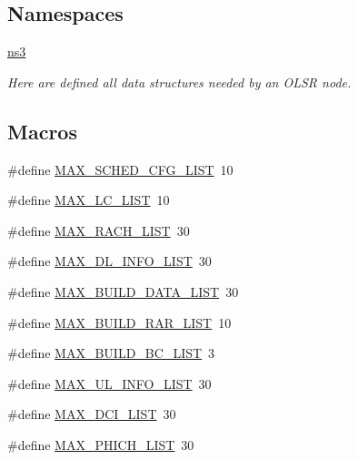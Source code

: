\subsection*{Namespaces}
\begin{DoxyCompactItemize}
\item 
 \hyperlink{namespacens3}{ns3}
\begin{DoxyCompactList}\small\item\em Here are defined all data structures needed by an O\+L\+SR node. \end{DoxyCompactList}\end{DoxyCompactItemize}
\subsection*{Macros}
\begin{DoxyCompactItemize}
\item 
\#define \hyperlink{ff-mac-common_8h_aad4dc08fdd5cdb203f02603b0a6b3d89}{M\+A\+X\+\_\+\+S\+C\+H\+E\+D\+\_\+\+C\+F\+G\+\_\+\+L\+I\+ST}~10
\item 
\#define \hyperlink{ff-mac-common_8h_a7c5f9089622a954046da0233f8170d7b}{M\+A\+X\+\_\+\+L\+C\+\_\+\+L\+I\+ST}~10
\item 
\#define \hyperlink{ff-mac-common_8h_a5398bf2c98470d11ed72c02bbbb394d4}{M\+A\+X\+\_\+\+R\+A\+C\+H\+\_\+\+L\+I\+ST}~30
\item 
\#define \hyperlink{ff-mac-common_8h_ac3cb58b4e7ec513eef5541fcd63e5bcf}{M\+A\+X\+\_\+\+D\+L\+\_\+\+I\+N\+F\+O\+\_\+\+L\+I\+ST}~30
\item 
\#define \hyperlink{ff-mac-common_8h_a9487fcd0bc7829ab33e710bff66188d2}{M\+A\+X\+\_\+\+B\+U\+I\+L\+D\+\_\+\+D\+A\+T\+A\+\_\+\+L\+I\+ST}~30
\item 
\#define \hyperlink{ff-mac-common_8h_a639682eee3d4c39e0fcdc7f75c67946f}{M\+A\+X\+\_\+\+B\+U\+I\+L\+D\+\_\+\+R\+A\+R\+\_\+\+L\+I\+ST}~10
\item 
\#define \hyperlink{ff-mac-common_8h_a8a7338a6269bfde52aee76311c46ecbc}{M\+A\+X\+\_\+\+B\+U\+I\+L\+D\+\_\+\+B\+C\+\_\+\+L\+I\+ST}~3
\item 
\#define \hyperlink{ff-mac-common_8h_aa3b535d19d648899d1099a87baa468c4}{M\+A\+X\+\_\+\+U\+L\+\_\+\+I\+N\+F\+O\+\_\+\+L\+I\+ST}~30
\item 
\#define \hyperlink{ff-mac-common_8h_aa8f13728f4f57396805e495e8d78e585}{M\+A\+X\+\_\+\+D\+C\+I\+\_\+\+L\+I\+ST}~30
\item 
\#define \hyperlink{ff-mac-common_8h_a09e6e0b6ed594c65664014e54950f915}{M\+A\+X\+\_\+\+P\+H\+I\+C\+H\+\_\+\+L\+I\+ST}~30

\end{DoxyCompactItemize}
